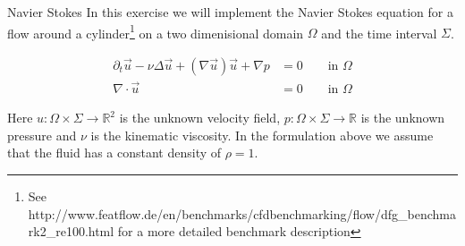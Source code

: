 \documentclass[12pt,a4paper]{article}
\newcommand{\Laplace}{\Delta}
\begin{document}
\begin{Exercise}{Navier Stokes}
  In this exercise we will implement the Navier Stokes equation for a flow
  around a cylinder\footnote{See
    http://www.featflow.de/en/benchmarks/cfdbenchmarking/flow/dfg\_benchmark2\_re100.html
    for a more detailed benchmark description} on a two dimenisional domain
  $\Omega$ and the time interval $\Sigma$.

  \begin{equation}
    \begin{aligned}
      \partial_t \vec{u} - \nu \Laplace \vec{u} + (\nabla \vec{u}) \vec{u} + \nabla p &= 0 \qquad \text{in $\Omega$}\\
      \nabla \cdot \vec{u} &= 0 \qquad \text{in $\Omega$}
    \end{aligned}
    \label{eq:navier-stokes}
  \end{equation}

  Here $u:\Omega\times\Sigma\to\mathbb{R}^2$ is the unknown velocity field,
  $p:\Omega\times\Sigma\to\mathbb{R}$ is the unknown pressure and $\nu$ is the
  kinematic viscosity. In the formulation above we assume that the fluid has a
  constant density of $\rho=1$.

  \begin{center}
  \end{center}


\end{Exercise}
\end{document}
